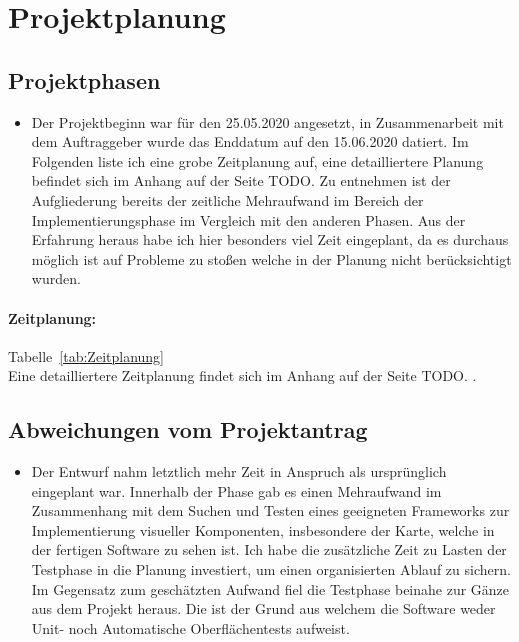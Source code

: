 \section{Projektplanung} 
\label{sec:Projektplanung}


\subsection{Projektphasen}
\label{sec:Projektphasen}

\begin{itemize}
	\item Der Projektbeginn war für den 25.05.2020 angesetzt, in Zusammenarbeit mit dem Auftraggeber wurde das Enddatum auf den 15.06.2020 datiert. Im Folgenden liste ich eine grobe Zeitplanung auf, eine detailliertere Planung befindet sich im Anhang auf der Seite TODO. Zu entnehmen ist der Aufgliederung bereits der zeitliche Mehraufwand im Bereich der Implementierungsphase im Vergleich mit den anderen Phasen. Aus der Erfahrung heraus habe ich hier besonders viel Zeit eingeplant, da es durchaus möglich ist auf Probleme zu stoßen welche in der Planung nicht berücksichtigt wurden.  
\end{itemize}
\paragraph{Zeitplanung:}
Tabelle~\ref{tab:Zeitplanung}
\\
Eine detailliertere Zeitplanung findet sich im Anhang auf der Seite TODO. .  

\subsection{Abweichungen vom Projektantrag}
\label{sec:AbweichungenProjektantrag}

\begin{itemize}
	\item Der Entwurf nahm letztlich mehr Zeit in Anspruch als ursprünglich eingeplant war. Innerhalb der Phase gab es einen Mehraufwand im Zusammenhang mit dem Suchen und Testen eines geeigneten Frameworks zur Implementierung visueller Komponenten, insbesondere der Karte, welche in der fertigen Software zu sehen ist. Ich habe die zusätzliche Zeit zu Lasten der Testphase in die Planung investiert, um einen organisierten Ablauf zu sichern. Im Gegensatz zum geschätzten Aufwand fiel die Testphase beinahe zur Gänze aus dem Projekt heraus. Die ist der Grund aus welchem die Software weder Unit- noch Automatische Oberflächentests aufweist.  
\end{itemize}


